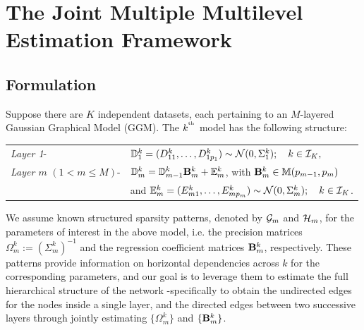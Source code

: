 \section{The Joint Multiple Multilevel Estimation Framework}
\label{sec:sec2}

\subsection{Formulation}
Suppose there are $K$ independent datasets, each pertaining to an $M$-layered Gaussian Graphical Model (GGM). The $k^{\operatorname*{^{\text{th}}}}$ model has the following structure:

\vspace{1em}
\begin{tabular}{ll}
{\it Layer 1}- &
%
${\mathbb{D}}_1^k = (D_{1 1}^k, \ldots, D^k_{1 p_1}) \sim
{\cal{N}} (0, \Sigma_1^k); \quad k \in {\cal{I}}_K,$\\
{\it Layer $m$} $(1< m \leq M)$-  &
%
$ {\mathbb{D}}_m^k = {\mathbb{D}}_{m-1}^k {\mathbf{B}}_m^k + {\mathbb{E}}_m^k$, with ${\mathbf{B}}_m^k \in {\mathbb{M}}(p_{m-1}, p_m) $\\
& and ${\mathbb{E}}_m^k = (E_{m 1}^k, \ldots, E^k_{m p_m}) \sim
{\cal{N}} (0, \Sigma_m^k); \quad k \in {\cal{I}}_K $.\\
\end{tabular}
\vspace{1em}

We assume known structured sparsity patterns, denoted by ${\cal{G}}_m$ and ${\cal{H}}_m$, for the parameters of interest in the above model, i.e. the precision matrices $\Omega_m^k := (\Sigma_m^k)^{-1}$ and the regression coefficient matrices ${\mathbf{B}}_m^k$, respectively. These patterns provide information on horizontal dependencies across $k$ for the corresponding parameters, and our goal is to leverage them to estimate the full hierarchical structure of the network -specifically to obtain the undirected edges for the nodes inside a single layer, and the directed edges between two successive layers through jointly estimating $\{ \Omega_m^k \}$ and $\{ {\mathbf{B}}_m^k \}$.


